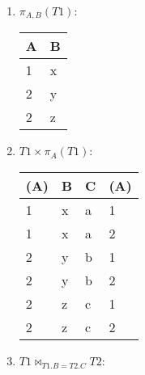 \documentclass{article}
\begin{document}
\begin{enumerate}
    \item $\pi_{A,B}(T1)$: 
    
\begin{table}[!h] \centering
\begin{tabular}{|l|l|}
\hline
\textbf{A} & \textbf{B} \\ \hline
1          & x          \\ \hline
2          & y          \\ \hline
2          & z          \\ \hline
\end{tabular}
\end{table}
    \item $T1 \times \pi _A(T1)$:    
\begin{table}[!h] \centering
\begin{tabular}{|l|l|l|l|}
\hline
\textbf{(A)} & \textbf{B} & \textbf{C} & \textbf{(A)} \\ \hline
1            & x          & a          & 1            \\ \hline
1            & x          & a          & 2            \\ \hline
2            & y          & b          & 1            \\ \hline
2            & y          & b          & 2            \\ \hline
2            & z          & c          & 1            \\ \hline
2            & z          & c          & 2            \\ \hline
\end{tabular}
\end{table}
    \item $T1 \bowtie_{T1.B=T2.C} T2$: 
    

\end{enumerate}
\end{document}
